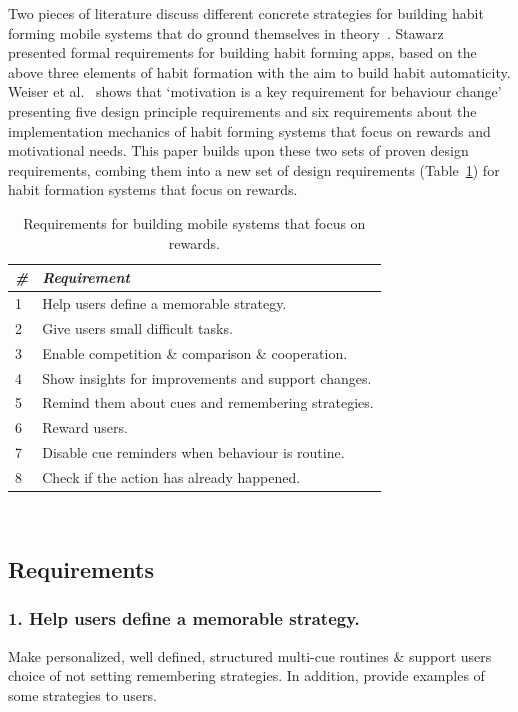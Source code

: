\documentclass{scaffold/sigchi}
\begin{document}
Two pieces of literature discuss different concrete strategies for building habit forming mobile systems that do ground themselves in theory~\cite{thesis_kathy, article_taxonomy_motivational_affordances_meaningful}. Stawarz~\cite{thesis_kathy} presented formal requirements for building habit forming apps, based on the above three elements of habit formation with the aim to build habit automaticity. Weiser et al.~\cite{article_taxonomy_motivational_affordances_meaningful} shows that `motivation is a key requirement for behaviour change' presenting five design principle requirements and six requirements about the implementation mechanics of habit forming systems that focus on rewards and motivational needs. This paper builds upon these two sets of proven design requirements, combing them into a new set of design requirements (Table~\ref{tab:requirements_mine}) for habit formation systems that focus on rewards.

\begin{table}
  \centering
  \begin{tabular}{l | l}
    {\small\textit{\#}}
    & {\small \textit{Requirement}}\\
    \midrule
    1 & Help users define a memorable strategy. \\
    2 & Give users small difficult tasks. \\
    3 & Enable competition \& comparison \& cooperation. \\
    4 & Show insights for improvements and support changes. \\
    5 & Remind them about cues and remembering strategies. \\
    6 & Reward users. \\
    7 & Disable cue reminders when behaviour is routine. \\
    8 & Check if the action has already happened. \\
  \end{tabular}
  \caption{Requirements for building mobile systems that focus on rewards.}~\label{tab:requirements_mine}
\end{table}

\subsection{Requirements}
\subsubsection{1. Help users define a memorable strategy.}
Make personalized, well defined, structured multi-cue routines \& support users choice of not setting remembering strategies. In addition, provide examples of some strategies to users.
\end{document}
